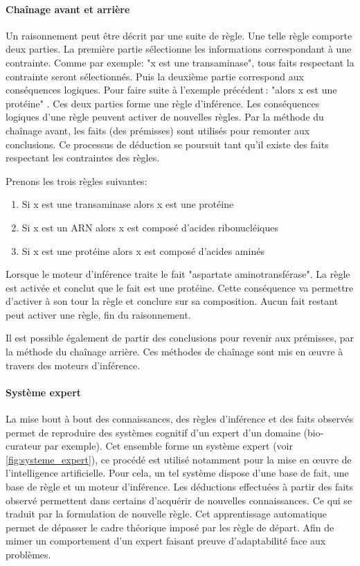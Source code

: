 \begin{refsegment}
    \paragraph{Chaînage avant et arrière} %
    Un raisonnement peut être décrit par une suite de règle. Une telle règle comporte deux parties. La première partie sélectionne les informations correspondant à une contrainte. Comme par exemple: "x est une transaminase", tous faits respectant la contrainte seront sélectionnés. Puis la deuxième partie correspond aux conséquences logiques. Pour faire suite à l'exemple précédent : "alors x est une protéine" . Ces deux parties forme une règle d'inférence. Les conséquences logiques d'une règle peuvent activer de nouvelles règles. Par la méthode du chaînage avant, les faits (des prémisses) sont utilisés pour remonter aux conclusions. Ce processus de déduction se poursuit tant qu'il existe des faits respectant les contraintes des règles.
    
    Prenons les trois règles suivantes:\nolisttopbreak    
    \begin{enumerate}
        \item Si x est une transaminase alors x est une protéine
        \item Si x est un ARN alors x est composé d'acides ribonucléiques
        \item Si x est une protéine alors x est composé d'acides aminés
    \end{enumerate}

    Lorsque le moteur d'inférence traite le fait "aspartate aminotransférase". La règle  est activée et  conclut que le fait est une protéine. Cette conséquence va permettre d'activer à son tour la règle  et conclure sur sa composition. Aucun fait restant peut activer une règle, fin du raisonnement.
    
    Il est possible également de partir des conclusions pour revenir aux prémisses, par la méthode du chaînage arrière. Ces méthodes de chaînage sont mis en œuvre à travers des moteurs d'inférence.
    
    \paragraph{Système expert} La mise bout à bout des connaissances, des règles d'inférence et des faits observés permet de reproduire des systèmes cognitif d'un expert d'un domaine (bio-curateur par exemple). Cet ensemble forme un système expert (voir \cref{fig:systeme_expert}), ce procédé est utilisé notamment pour la mise en œuvre de l'intelligence artificielle. Pour cela, un tel système dispose d'une base de fait, une base de règle et un moteur d'inférence. Les déductions effectuées à partir des faits observé permettent dans certains d'acquérir de nouvelles connaissances. Ce qui se traduit par la formulation de nouvelle règle. Cet apprentissage automatique permet de dépasser le cadre théorique imposé par les règle de départ. Afin de mimer un comportement d'un expert faisant preuve d'adaptabilité face aux problèmes.
    

\end{refsegment}
